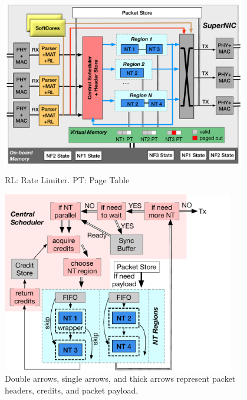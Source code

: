 {
\begin{figure}[th]
\begin{minipage}{1.1\columnwidth}
\begin{center}
\centerline{\includegraphics[width=0.95\textwidth]{Figures/board.pdf}}
\vspace{-0.1in}
{
RL: Rate Limiter. PT: Page Table
}
\end{center}
\end{minipage}
\begin{minipage}{0.05in}
\hspace{0.05in}
\end{minipage}
\begin{minipage}{0.9\columnwidth}
\hspace{0.2in} \includegraphics[width=0.9\textwidth]{Figures/scheduler.pdf}
\vspace{-0.1in}
{
Double arrows, single arrows, and thick arrows represent packet headers, credits, and packet payload.
}
\end{minipage}
\vspace{-0.1in}
\end{figure}
}

